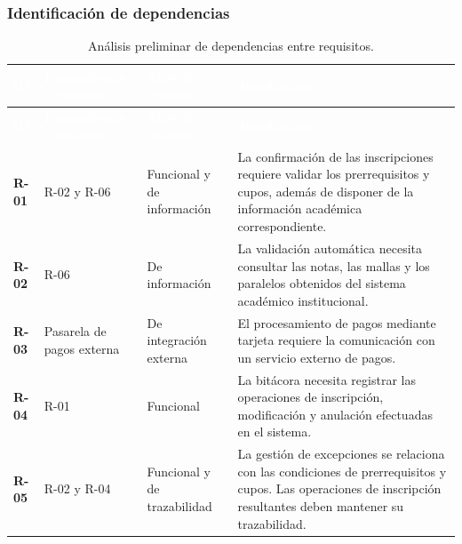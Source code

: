\documentclass[12pt,a4paper]{article}
\newcommand{\cabecera}[1]{
    \textcolor{white}{\textbf{#1}}
}
\begin{document}
\subsubsection{Identificación de dependencias}

\begingroup

\small
\singlespacing
\setlength{\tabcolsep}{4pt}

\begin{longtable}{
    C{1.1cm}
    L{3.2cm}
    L{4.0cm}
    L{6.0cm}
}

\caption{Análisis preliminar de dependencias entre requisitos.}
\label{tab:dependencias}\\

\cabecera{ID} &
\cabecera{Dependencia o relación} &
\cabecera{Tipo de relación} &
\cabecera{Justificación} \\

\endfirsthead

\cabecera{ID} &
\cabecera{Dependencia o relación} &
\cabecera{Tipo de relación} &
\cabecera{Justificación} \\

\endhead

\bottomrule

\endfoot

\textbf{R-01} &
R-02 y R-06 &
Funcional y de información &
La confirmación de las inscripciones requiere
validar los prerrequisitos y cupos, además de
disponer de la información académica correspondiente. \\

\textbf{R-02} &
R-06 &
De información &
La validación automática necesita consultar
las notas, las mallas y los paralelos obtenidos
del sistema académico institucional. \\

\textbf{R-03} &
Pasarela de pagos externa &
De integración externa &
El procesamiento de pagos mediante tarjeta
requiere la comunicación con un servicio
externo de pagos. \\

\textbf{R-04} &
R-01 &
Funcional &
La bitácora necesita registrar las operaciones
de inscripción, modificación y anulación
efectuadas en el sistema. \\

\textbf{R-05} &
R-02 y R-04 &
Funcional y de trazabilidad &
La gestión de excepciones se relaciona con
las condiciones de prerrequisitos y cupos.
Las operaciones de inscripción resultantes
deben mantener su trazabilidad. \\


\end{longtable}
\end{document}
